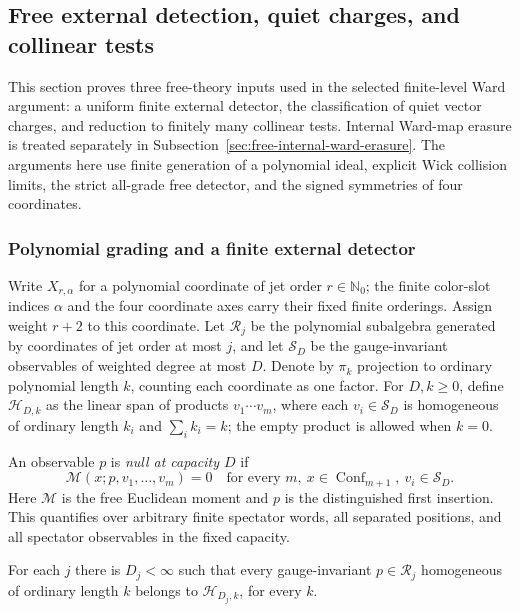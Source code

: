 \subsection{Free external detection, quiet charges, and collinear tests}
\label{sec:physical-ward-free-classification}

This section proves three free-theory inputs used in the selected
finite-level Ward argument: a uniform finite external detector, the
classification of quiet vector charges, and reduction to finitely many
collinear tests.  Internal Ward-map erasure is treated separately in
Subsection~\ref{sec:free-internal-ward-erasure}.  The arguments here use
finite generation of a polynomial ideal, explicit Wick collision limits,
the strict all-grade free detector, and the signed symmetries of four coordinates.

\subsubsection{Polynomial grading and a finite external detector}

Write $X_{r,\alpha}$ for a polynomial coordinate of jet order
$r\in\mathbb N_0$; the finite color-slot indices $\alpha$ and the four
coordinate axes carry their fixed finite orderings.  Assign
weight $r+2$ to this coordinate.  Let $\mathcal R_j$ be the polynomial
subalgebra generated by coordinates of jet order at most $j$, and let
$\mathcal S_D$ be the gauge-invariant observables of weighted degree at
most $D$.  Denote by $\pi_k$ projection to ordinary polynomial length
$k$, counting each coordinate as one factor.  For $D,k\geq0$, define
$\mathcal H_{D,k}$ as the linear span of products
$v_1\cdots v_m$, where each $v_i\in\mathcal S_D$ is homogeneous of
ordinary length $k_i$ and $\sum_i k_i=k$; the empty product is allowed
when $k=0$.

An observable $p$ is \emph{null at capacity $D$} if
\begin{equation}
 \mathcal M(x;p,v_1,\ldots,v_m)=0
 \quad\text{for every }m,\ x\in\operatorname{Conf}_{m+1},
 \ v_i\in\mathcal S_D.
\label{eq:free-null-capacity}
\end{equation}
Here $\mathcal M$ is the free Euclidean moment and $p$ is the distinguished
first insertion.  This quantifies over arbitrary finite spectator words,
all separated positions, and all spectator observables in the fixed
capacity.

\begin{lemma}
\label{lem:free-uniform-generation}
For each $j$ there is $D_j<\infty$ such that every gauge-invariant
$p\in\mathcal R_j$ homogeneous of ordinary length $k$ belongs to
$\mathcal H_{D_j,k}$, for every $k$.
\end{lemma}

